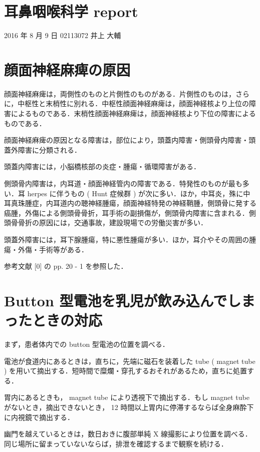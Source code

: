 \documentclass[10pt,uplatex]{jsarticle}
\begin{document}
\section*{耳鼻咽喉科学 report}

\begin{flushright}
2016 年 8 月 9 日 02113072 井上 大輔
\end{flushright}

\section{顔面神経麻痺の原因}

顔面神経麻痺は，両側性のものと片側性のものがある．片側性のものは，さらに，中枢性と末梢性に別れる．中枢性顔面神経麻痺は，顔面神経核より上位の障害によるものである．末梢性顔面神経麻痺は，顔面神経核より下位の障害によるものである．

顔面神経麻痺の原因となる障害は，部位により，頭蓋内障害・側頭骨内障害・頭蓋外障害に分類される．

頭蓋内障害には，小脳橋核部の炎症・腫瘍・循環障害がある．

側頭骨内障害は，内耳道・顔面神経管内の障害である．特発性のものが最も多い．耳 herpes に伴うもの ( Hunt 症候群 ) が次に多い．ほか，中耳炎，殊に中耳真珠腫症，内耳道内の聴神経腫瘍，顔面神経特発の神経鞘腫，側頭骨に発する癌腫，外傷による側頭骨骨折，耳手術の副損傷が，側頭骨内障害に含まれる．側頭骨骨折の原因には，交通事故，建設現場での労働災害が多い．

頭蓋外障害には，耳下腺腫瘍，特に悪性腫瘍が多い．ほか，耳介やその周囲の腫瘍・外傷・手術等がある．

参考文献 [0] の pp. 20 - 1 を参照した．

\section{Button 型電池を乳児が飲み込んでしまったときの対応}

まず，患者体内での button 型電池の位置を調べる．

電池が食道内にあるときは，直ちに，先端に磁石を装着した tube ( magnet tube ) を用いて摘出する．短時間で糜爛・穿孔するおそれがあるため，直ちに処置する．

胃内にあるときも， magnet tube により透視下で摘出する．もし magnet tube がないとき，摘出できないとき， 12 時間以上胃内に停滞するならば全身麻酔下に内視鏡で摘出する．

幽門を越えているときは，数日おきに腹部単純 X 線撮影により位置を調べる．同じ場所に留まっていないならば，排泄を確認するまで観察を続ける．
\end{document}
